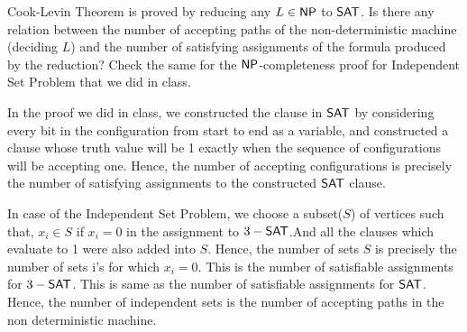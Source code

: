 \documentclass[12pt]{exam}
\begin{document}
\begin{questions}
\begin{solution}
  
  
\end{solution}


\question
Cook-Levin Theorem is proved by reducing any $L \in {\ensuremath{\mathsf{NP}}}$ to ${\mathsf{SAT}}$. Is there any relation between the number of accepting paths of the non-deterministic machine (deciding $L$) and the number of satisfying assignments of the formula produced by the reduction? Check the same for the ${\mathsf{NP}}$-completeness proof for {\sc Independent Set Problem} that we did in class.

\end{questions}

\begin{solution}
\newline
 In the proof we did in class, we constructed the clause in ${\mathsf{SAT}}$ by considering every bit in the configuration from start to end as a variable,
 and constructed a clause whose truth value will be 1 exactly when the sequence of configurations will be accepting one. Hence, the number of accepting
 configurations is precisely the number of satisfying assignments to the constructed ${\mathsf{SAT}}$ clause. \newline
 
 In case of the {\sc Independent Set Problem}, we choose a subset($S$) of vertices such that, \newline
 $x_{i} \in S$ if $x_{i} = 0$ in the assignment to $3-{\mathsf{SAT}}$.And all the clauses which evaluate to 1 were also added into $S$. \newline
 Hence, the number of sets $S$ is precisely the number of sets i's for which $x_{i} = 0$. This is the number of satisfiable assignments for $3-{\mathsf{SAT}}$.
 This is same as the number of satisfiable assignments for ${\mathsf{SAT}}$. Hence, the number of independent sets is the
 number of accepting paths in the non deterministic machine.
\end{solution}

%
\end{document}
